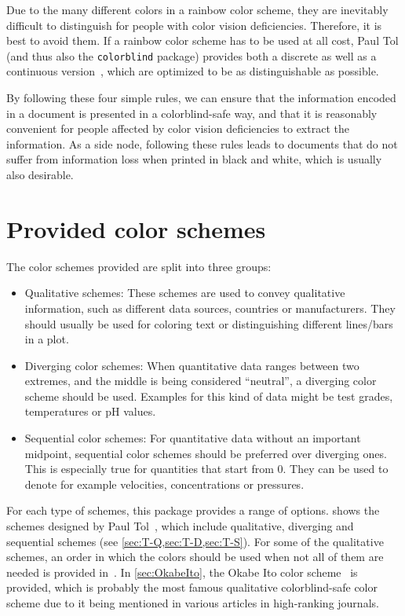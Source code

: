 \documentclass{scrartcl}
\begin{document}
Due to the many different colors in a rainbow color scheme, they are inevitably difficult to distinguish for people with color vision deficiencies.
Therefore, it is best to avoid them.
If a rainbow color scheme has to be used at all cost, Paul Tol (and thus also the \texttt{colorblind} package) provides both a discrete as well as a continuous version~\cite{Tol}, which are optimized to be as distinguishable as possible.

By following these four simple rules, we can ensure that the information encoded in a document is presented in a colorblind-safe way, and that it is reasonably convenient for people affected by color vision deficiencies to extract the information.
As a side node, following these rules leads to documents that do not suffer from information loss when printed in black and white, which is usually also desirable.

\section{Provided color schemes}\label{sec:colors}
The color schemes provided are split into three groups:
\begin{itemize}
	\item Qualitative schemes:\newline
	      These schemes are used to convey qualitative information, such as different data sources, countries or manufacturers.
	      They should usually be used for coloring text or distinguishing different lines/bars in a plot.
	\item Diverging color schemes:\newline
	      When quantitative data ranges between two extremes, and the middle is being considered ``neutral'', a diverging color scheme should be used.
	      Examples for this kind of data might be test grades, temperatures or pH values.
	\item Sequential color schemes:\newline
	      For quantitative data without an important midpoint, sequential color schemes should be preferred over diverging ones.
	      This is especially true for quantities that start from $0$.
	      They can be used to denote for example velocities, concentrations or pressures.
\end{itemize}

For each type of schemes, this package provides a range of options.
 shows the schemes designed by Paul Tol~\cite{Tol}, which include qualitative, diverging and sequential schemes (see \cref{sec:T-Q,sec:T-D,sec:T-S}).
For some of the qualitative schemes, an order in which the colors should be used when not all of them are needed is provided in~\cite{Tol}.
In \cref{sec:OkabeIto}, the Okabe Ito color scheme~\cite{Okabe_2002} is provided, which is probably the most famous qualitative colorblind-safe color scheme due to it being mentioned in various articles in high-ranking journals.
\end{document}
